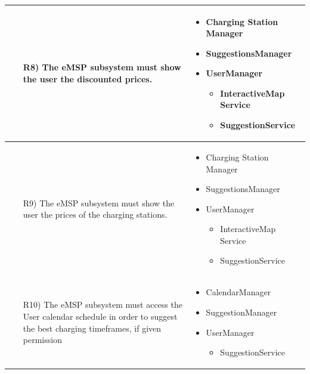 \documentclass[table, 12pt]{article}
\begin{document}
\begin{longtable}{|p{}|p{}|}
    \begin{itemize}
        \item[R8)] The eMSP subsystem must show the user the discounted prices.
    \end{itemize}
    &
    \begin{itemize}
        \item Charging Station Manager
        \item SuggestionsManager %
        \item UserManager
        \begin{itemize}
            \setlength{\itemindent}{-5px}
            \item InteractiveMap Service
            \item SuggestionService
        \end{itemize}
    \end{itemize}
    \\\hline

    \begin{itemize}
        \item[R9)] The eMSP subsystem must show the user the prices of the charging stations.
    \end{itemize}
    &
    \begin{itemize}
        \item Charging Station Manager
        \item SuggestionsManager %
        \item UserManager
        \begin{itemize}
            \setlength{\itemindent}{-5px}
            \item InteractiveMap Service
            \item SuggestionService
        \end{itemize}
    \end{itemize}
    \\\hline

    \begin{itemize}
        \item[R10)] The eMSP subsystem must access the User calendar schedule in order to suggest the best charging timeframes, if given permission
    \end{itemize}
    &
    \begin{itemize}
        \item CalendarManager
        \item SuggestionManager
        \item UserManager
        \begin{itemize}
            \setlength{\itemindent}{-5px}
            \item SuggestionService
        \end{itemize}
    \end{itemize}
    \\\hline


\end{longtable}
\end{document}
